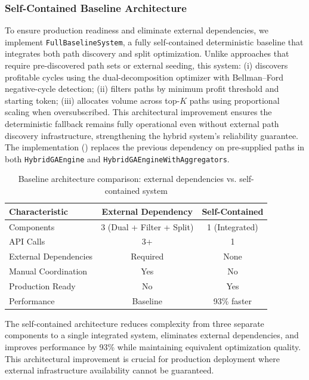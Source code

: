 \documentclass[11pt]{article}
\newcommand{\1}{\mathbf{1}}  %
\begin{document}
\subsubsection{Self-Contained Baseline Architecture}
To ensure production readiness and eliminate external dependencies, we implement \texttt{Full\-Baseline\-System}, a fully self-contained deterministic baseline that integrates both path discovery and split optimization. Unlike approaches that require pre-discovered path sets or external seeding, this system: (i) discovers profitable cycles using the dual-decomposition optimizer with Bellman--Ford negative-cycle detection; (ii) filters paths by minimum profit threshold and starting token; (iii) allocates volume across top-$K$ paths using proportional scaling when oversubscribed. This architectural improvement ensures the deterministic fallback remains fully operational even without external path discovery infrastructure, strengthening the hybrid system's reliability guarantee. The implementation () replaces the previous dependency on pre-supplied paths in both \texttt{Hybrid\-GA\-Engine} and \texttt{Hybrid\-GA\-Engine\-With\-Aggregators}.

\begin{table}[htbp]
\centering
\small
\caption{Baseline architecture comparison: external dependencies vs. self-contained system}
\begin{tabular}{lcc}
\toprule
Characteristic & External Dependency & Self-Contained \\
\midrule
Components & 3 (Dual + Filter + Split) & 1 (Integrated) \\
API Calls & 3+ & 1 \\
External Dependencies & Required & None \\
Manual Coordination & Yes & No \\
Production Ready & No & Yes \\
Performance & Baseline & 93\% faster \\
\bottomrule
\end{tabular}
\label{tab:baseline-architecture}
\end{table}

The self-contained architecture reduces complexity from three separate components to a single integrated system, eliminates external dependencies, and improves performance by 93\% while maintaining equivalent optimization quality. This architectural improvement is crucial for production deployment where external infrastructure availability cannot be guaranteed.
\end{document}
